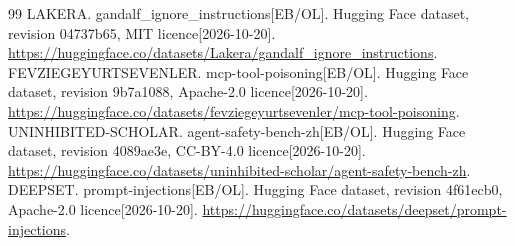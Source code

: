 \begin{thebibliography}{99}
 LAKERA. gandalf\_ignore\_instructions[EB/OL]. Hugging Face dataset, revision 04737b65, MIT licence[2026-10-20]. \url{https://huggingface.co/datasets/Lakera/gandalf_ignore_instructions}.
 FEVZIEGEYURTSEVENLER. mcp-tool-poisoning[EB/OL]. Hugging Face dataset, revision 9b7a1088, Apache-2.0 licence[2026-10-20]. \url{https://huggingface.co/datasets/fevziegeyurtsevenler/mcp-tool-poisoning}.
 UNINHIBITED-SCHOLAR. agent-safety-bench-zh[EB/OL]. Hugging Face dataset, revision 4089ae3e, CC-BY-4.0 licence[2026-10-20]. \url{https://huggingface.co/datasets/uninhibited-scholar/agent-safety-bench-zh}.
 DEEPSET. prompt-injections[EB/OL]. Hugging Face dataset, revision 4f61ecb0, Apache-2.0 licence[2026-10-20]. \url{https://huggingface.co/datasets/deepset/prompt-injections}.
\end{thebibliography}
